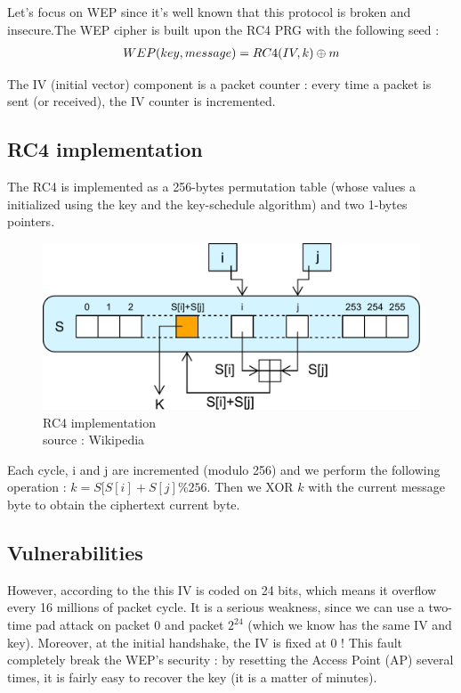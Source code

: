 Let's focus on WEP since it's well known that this protocol is broken and insecure.The WEP cipher is built upon the RC4 PRG  with the following seed : 
\begin{align}
     WEP(key,message) = RC4(IV,k) \oplus m 
\end{align}

The IV (initial vector) component is a packet counter : every time a packet is sent (or received), the IV counter is incremented.

\subsection{RC4 implementation}

The RC4 is implemented as a 256-bytes permutation table (whose values a initialized using the key and the key-schedule algorithm) and two 1-bytes pointers. 

\begin{figure}[hb!]
    \centering
       \includegraphics[width=\textwidth]{images/RC4.pdf}
	\caption{RC4 implementation \\ source : Wikipedia}
	\label{fig:RC4}
\end{figure}

Each cycle, i and j are incremented (modulo 256) and we perform the following operation : $k = S[ S[i] + S[j] \% 256$. Then we XOR $k$ with the current message byte to obtain the ciphertext current byte.

\subsection{Vulnerabilities}
However, according to the  this IV is coded on 24 bits, which means it overflow every 16 millions of packet cycle. 
It is a serious weakness, since we can use a two-time pad attack on packet $0$ and packet $2^24$ (which we know has the same IV and key). Moreover, at the initial handshake, the IV is fixed at 0 ! This fault completely break the WEP's security : by resetting the Access Point (AP) several times, it is fairly easy to recover the key (it is a matter of minutes).\\

